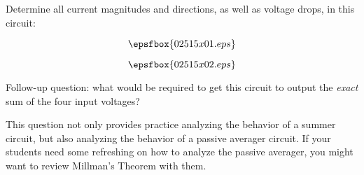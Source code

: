 

Determine all current magnitudes and directions, as well as voltage drops, in this circuit:

$$\epsfbox{02515x01.eps}$$







$$\epsfbox{02515x02.eps}$$

\vskip 10pt

Follow-up question: what would be required to get this circuit to output the {\it exact} sum of the four input voltages?







This question not only provides practice analyzing the behavior of a summer circuit, but also analyzing the behavior of a passive averager circuit.  If your students need some refreshing on how to analyze the passive averager, you might want to review Millman's Theorem with them.




